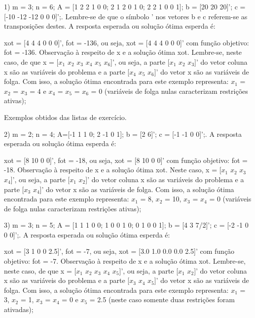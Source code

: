 \documentclass[10pt]{article}
\begin{document}
1)
m = 3; n = 6; A = [1 2 2 1 0 0; 2 1 2 0 1 0; 2 2 1 0 0 1]; b = [20 20 20]'; c = [-10 -12 -12 0 0 0]';. Lembre-se de que o símbolo ' nos vetores b e c referem-se as transposições destes. A resposta esperada ou solução ótima esperda é:
\newline

xot = [4 4 4 0 0 0]', fot = -136, ou seja, xot = [4 4 4 0 0 0]' com função objetivo: fot = -136.
\newline
Observação à respeito de x e a solução ótima xot. Lembre-se, neste caso, de que x = [$x_1$ $x_2$ $x_3$ $x_4$ $x_5$ $x_6$]', ou seja, a parte [$x_1$ $x_2$ $x_3$]' do vetor coluna x são as variáveis do problema e a parte [$x_4$ $x_5$ $x_6$]' do vetor x são as variáveis de folga. Com isso, a solução ótima encontrada para este exemplo representa: $x_1$ = $x_2$ = $x_3$ = $4$ e $x_4$ = $x_5$ = $x_6$ = $0$ (variáveis de folga nulas caracterizam restrições ativas);
\newline

Exemplos obtidos das listas de exercício.
\newline

2) m = 2; n = 4; A=[-1 1 1 0; 2 -1 0 1]; b = [2 6]'; c = [-1 -1 0 0]';. A resposta esperada ou solução ótima esperda é:
\newline

xot = [8 10 0 0]', fot = -18, ou seja, xot = [8 10 0 0]' com função objetivo: fot = -18.
\newline
Observação à respeito de x e a solução ótima xot. Neste caso, x = [$x_1$ $x_2$ $x_3$ $x_4$]', ou seja, a parte [$x_1$ $x_2$]' do vetor coluna x são as variáveis do problema e a parte [$x_3$ $x_4$]' do vetor x são as variáveis de folga. Com isso, a solução ótima encontrada para este exemplo representa: $x_1$ = 8, $x_2$ = 10, $x_3$ = $x_4$ = 0 (variáveis de folga nulas caracterizam restrições ativas);
\newline

3) m = 3; n = 5; A = [1 1 1 0 0; 1 0 0 1 0; 0 1 0 0 1]; b = [4 3 7/2]'; c = [-2 -1 0 0 0]';. A resposta esperada ou solução ótima esperda é:
\newline

xot = [3 1 0 0 2.5]', fot = -7, ou seja, xot = [3.0 1.0 0.0 0.0 2.5]' com função objetivo: fot = -7.
\newline
Observação à respeito de x e a solução ótima xot. Lembre-se, neste caso, de que x = [$x_1$ $x_2$ $x_3$ $x_4$ $x_5$]', ou seja, a parte [$x_1$ $x_2$]' do vetor coluna x são as variáveis do problema e a parte [$x_3$ $x_4$ $x_5$]' do vetor x são as variáveis de folga. Com isso, a solução ótima encontrada para este exemplo representa: $x_1$ = 3, $x_2$ = 1, $x_3$ = $x_4$ = 0 e $x_5$ = 2.5 (neste caso somente duas restrições foram ativadas);
\newline
\end{document}
